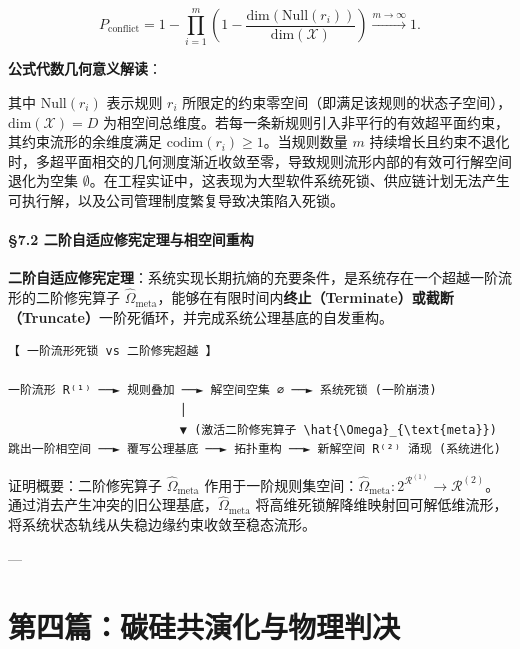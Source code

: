 \documentclass[11pt,a4paper,oneside]{ctexart}
\begin{document}
\begin{equation}
P_{\text{conflict}} = 1 - \prod_{i=1}^{m} \left(1 - \frac{\text{dim}(\text{Null}(r_i))}{\text{dim}(\mathcal{X})}\right) \xrightarrow{m \to \infty} 1.
\end{equation}

\begin{notebox}
\textbf{公式代数几何意义解读}：

其中 $\text{Null}(r_i)$ 表示规则 $r_i$ 所限定的约束零空间（即满足该规则的状态子空间），$\text{dim}(\mathcal{X}) = D$ 为相空间总维度。若每一条新规则引入非平行的有效超平面约束，其约束流形的余维度满足 $\text{codim}(r_i) \ge 1$。当规则数量 $m$ 持续增长且约束不退化时，多超平面相交的几何测度渐近收敛至零，导致规则流形内部的有效可行解空间退化为空集 $\emptyset$。在工程实证中，这表现为大型软件系统死锁、供应链计划无法产生可执行解，以及公司管理制度繁复导致决策陷入死锁。
\end{notebox}

\subsection{§7.2 二阶自适应修宪定理与相空间重构}

\textbf{二阶自适应修宪定理}：系统实现长期抗熵的充要条件，是系统存在一个超越一阶流形的二阶修宪算子 $\hat{\Omega}_{\text{meta}}$，能够在有限时间内\textbf{终止（Terminate）或截断（Truncate）}一阶死循环，并完成系统公理基底的自发重构。


\begin{tcolorbox}[colback=gray!5!white,colframe=gray!50!black,fontupper=\ttfamily\small]
\begin{verbatim}
【 一阶流形死锁 vs 二阶修宪超越 】

一阶流形 R⁽¹⁾ ──► 规则叠加 ──► 解空间空集 ∅ ──► 系统死锁 (一阶崩溃)
                        │
                        ▼ (激活二阶修宪算子 \hat{\Omega}_{\text{meta}})
跳出一阶相空间 ──► 覆写公理基底 ──► 拓扑重构 ──► 新解空间 R⁽²⁾ 涌现 (系统进化)
\end{verbatim}
\end{tcolorbox}

证明概要：二阶修宪算子 $\hat{\Omega}_{\text{meta}}$ 作用于一阶规则集空间：$\hat{\Omega}_{\text{meta}}: 2^{\mathcal{R}^{(1)}} \to \mathcal{R}^{(2)}$。通过消去产生冲突的旧公理基底，$\hat{\Omega}_{\text{meta}}$ 将高维死锁解降维映射回可解低维流形，将系统状态轨线从失稳边缘约束收敛至稳态流形。


---


\part{第四篇：碳硅共演化与物理判决}
\end{document}
